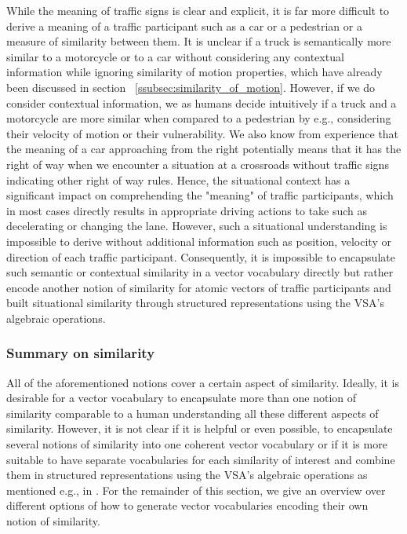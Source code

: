 While the meaning of traffic signs is clear and explicit, it is far more difficult to derive a meaning of a traffic participant such as a car or a pedestrian or a measure of similarity between them.
It is unclear if a truck is semantically more similar to a motorcycle or to a car without considering any contextual information while ignoring similarity of motion properties, which have already been discussed in section ~\ref{ssubsec:similarity_of_motion}.
However, if we do consider contextual information, we as humans decide intuitively if a truck and a motorcycle are more similar when compared to a pedestrian by e.g., considering their velocity of motion or their vulnerability.
We also know from experience that the meaning of a car approaching from the right potentially means that it has the right of way when we encounter a situation at a crossroads without traffic signs indicating other right of way rules. 
Hence, the situational context has a significant impact on comprehending the "meaning" of traffic participants, which in most cases directly results in appropriate driving actions to take such as decelerating or changing the lane.
However, such a situational understanding is impossible to derive without additional information such as position, velocity or direction of each traffic participant.
Consequently, it is impossible to encapsulate such semantic or contextual similarity in a vector vocabulary directly but rather encode another notion of similarity for atomic vectors of traffic participants and built situational similarity through structured representations using the \ac{VSA}'s algebraic operations.

\subsubsection{Summary on similarity}%
\label{ssubsec:summary_similarity}

All of the aforementioned notions cover a certain aspect of similarity.
Ideally, it is desirable for a vector vocabulary to encapsulate more than one notion of similarity comparable to a human understanding all these different aspects of similarity.
However, it is not clear if it is helpful or even possible, to encapsulate several notions of similarity into one coherent vector vocabulary or if it is more suitable to have separate vocabularies for each similarity of interest and combine them in structured representations using the \ac{VSA}'s algebraic operations as mentioned e.g., in \cite{Crawford2016}.
For the remainder of this section, we give an overview over different options of how to generate vector vocabularies encoding their own notion of similarity.

